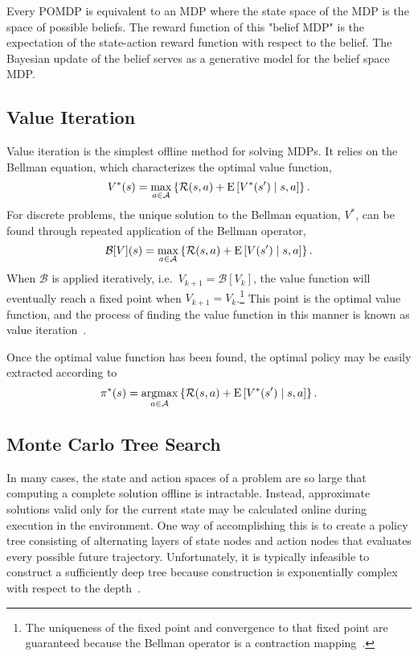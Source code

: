 Every POMDP is equivalent to an MDP where the state space of the MDP is the space of possible beliefs.
The reward function of this "belief MDP" is the expectation of the state-action reward function with respect to the belief.
The Bayesian update of the belief serves as a generative model for the belief space MDP.

\subsection{Value Iteration}

Value iteration is the simplest offline method for solving MDPs.
It relies on the Bellman equation, which characterizes the optimal value function,
\begin{equation}
    V^*(s) = \max_{a \in \mathcal{A}} \left\{\mathcal{R}(s,a) + \text{E}\left[V^*(s') \mid s, a \right]\right\} \text{.}
\end{equation}
For discrete problems, the unique solution to the Bellman equation, $V^*$, can be found through repeated application of the Bellman operator,
\begin{equation}
    \mathcal{B}[V](s) = \max_{a \in \mathcal{A}} \left\{\mathcal{R}(s,a) + \text{E} \left[V(s') \mid s, a \right] \right\} \text{.}
\end{equation}
When $\mathcal{B}$ is applied iteratively, i.e.\ $V_{k+1} = \mathcal{B}[V_k]$, the value function will eventually reach  a fixed point when $V_{k+1} = V_k$.\footnote{The uniqueness of the fixed point and convergence to that fixed point are guaranteed because the Bellman operator is a contraction mapping~\cite{johnsonbaugh2012foundations}.} This point is the optimal value function, and the process of finding the value function in this manner is known as value iteration~\cite{DB:05}.

Once the optimal value function has been found, the optimal policy may be easily extracted according to 
\begin{equation}
    \pi^*(s) = \argmax_{a \in \aspace} \left\{\reward(s,a) + \text{E}\left[V^*(s') \mid s, a \right]\right\} \text{.}
\end{equation}

\subsection{Monte Carlo Tree Search} \label{sec:mcts}

In many cases, the state and action spaces of a problem are so large that computing a complete solution offline is intractable.
Instead, approximate solutions valid only for the current state may be calculated online during execution in the environment.
One way of accomplishing this is to create a policy tree consisting of alternating layers of state nodes and action nodes that evaluates every possible future trajectory.
Unfortunately, it is typically infeasible to construct a sufficiently deep tree because construction is exponentially complex with respect to the depth~\cite{kochenderfer2015decision}.

